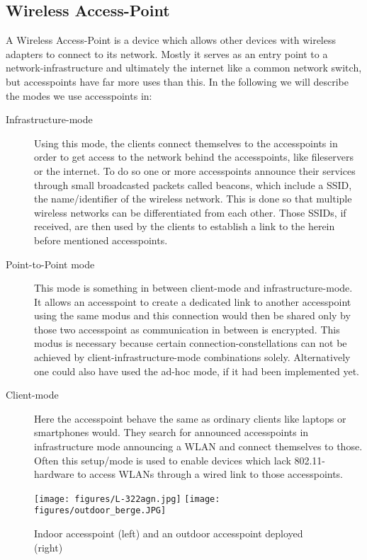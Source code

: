   \subsection{Wireless Access-Point}
    A Wireless Access-Point is a device which allows other devices with wireless adapters to connect to its network.
    Mostly it serves as an entry point to a network-infrastructure and ultimately the internet like a common network switch, 
    but accesspoints have far more uses than this. In the following we will describe the modes we use accesspoints in:
    
    \begin{description}
      \item[Infrastructure-mode]
	Using this mode, the clients connect themselves to the accesspoints in order to get access to the network behind the accesspoints, like fileservers or the internet.
	To do so one or more accesspoints announce their services through small broadcasted packets called beacons, which include a \ac{SSID}, 
	the name/identifier of the wireless network. This is done 
	so that multiple wireless networks can be differentiated from each other. Those SSIDs, if received, are then used by the clients to
	establish a link to the herein before mentioned accesspoints.

      \item [Point-to-Point mode]
	This mode is something in between client-mode and infrastructure-mode. 
	It allows an accesspoint to create a dedicated link to another accesspoint using the 	same modus and this connection would then be shared only by those two accesspoint
	as communication in between is encrypted. 
	This modus is necessary because certain connection-constellations can not be achieved by client-infrastructure-mode combinations solely.
	Alternatively one could also have used the ad-hoc mode, if it had been implemented yet.
	
      \item [Client-mode]
	Here the accesspoint behave the same as ordinary clients like laptops or smartphones would.
	They search for announced accesspoints in infrastructure mode announcing a \ac{WLAN} and connect themselves to those.
	Often this setup/mode is used to enable devices which lack 802.11-hardware to access WLANs through a wired link to those accesspoints.
    \end{description}
    
    \begin{figure}[h!]
      \centerline{
	\texttt{[image: figures/L-322agn.jpg]}
	\texttt{[image: figures/outdoor\_berge.JPG]}
      }
      \caption{Indoor accesspoint (left) and an outdoor accesspoint deployed (right) \cite{lancom}}
      \label{fig:L-322agn}
    \end{figure}
     
